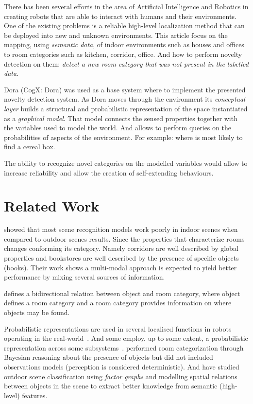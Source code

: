 \documentclass[runningheads,a4paper]{llncs}
\begin{document}
There has been several efforts in the area of Artificial Intelligence and Robotics in creating
robots that are able to interact with humans and their environments.
One of the existing problems is a reliable high-level localization method that can be deployed
into new and unknown environments.
This article focus on the mapping, using \emph{semantic data}, of indoor environments such as
houses and offices to room categories such as kitchen, corridor, office.
And how to perform novelty detection on them: \emph{detect a new room category that was not
present in the labelled data}.

Dora\cite{dora} (CogX: Dora) was used as a base system where to implement the presented novelty
detection system.
As Dora moves through the environment its \emph{conceptual layer} builds a structural and
probabilistic representation of the space instantiated as a \emph{graphical model}.
That model connects the sensed properties together with the variables used to model the world.
And allows to perform queries on the probabilities of aspects of the environment.
For example: where is most likely to find a cereal box\cite{exploiting}.

The ability to recognize novel categories on the modelled variables would allow to increase
reliability and allow the creation of self-extending behaviours.


\section{Related Work}
\cite{quattoni2009recognizing} showed that most scene recognition models work poorly in indoor
scenes when compared to outdoor scenes results.
Since the properties that characterize rooms changes conforming its category. Namely corridors are
well described by global properties and bookstores are well described by the presence of specific objects (books).
Their work shows a multi-modal approach is expected to yield better performance by mixing several sources of information.

\cite{galindo2005multi} defines a bidirectional relation between object and room category, where object defines a room category and a room category provides information on where objects may be found.

Probabilistic representations are used in several localised functions in robots operating in the real-world~\cite{gross2009toomas,maierprobabilistic}. And some employ, up to some extent, a probabilistic representation across some subsystems~\cite{kraft2008exploration}.
\cite{vasudevan2008bayesian} performed room categorization through Bayesian reasoning about the presence of objects but did not included observations models (perception is considered deterministic).
And \cite{boutell2006factor} have studied outdoor scene classification using \emph{factor graphs} and modelling spatial relations between objects in the scene to extract better knowledge from semantic (high-level) features.
\end{document}
